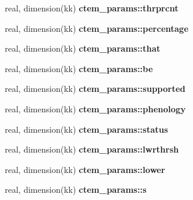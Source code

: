 \begin{DoxyCompactItemize}
\item 
\hypertarget{namespacectem__params_af5b1d396f621af177ae9b6011942df1c}{}real, dimension(kk) {\bfseries ctem\+\_\+params\+::thrprcnt}\label{namespacectem__params_af5b1d396f621af177ae9b6011942df1c}

\item 
\hypertarget{namespacectem__params_a815762546bc78fafa119f065d8c82038}{}real, dimension(kk) {\bfseries ctem\+\_\+params\+::percentage}\label{namespacectem__params_a815762546bc78fafa119f065d8c82038}

\item 
\hypertarget{namespacectem__params_a5ab7631de5a4b8262bd32cb00c568dd0}{}real, dimension(kk) {\bfseries ctem\+\_\+params\+::that}\label{namespacectem__params_a5ab7631de5a4b8262bd32cb00c568dd0}

\item 
\hypertarget{namespacectem__params_a054fdf169977a99a0c2ff7a0560f025f}{}real, dimension(kk) {\bfseries ctem\+\_\+params\+::be}\label{namespacectem__params_a054fdf169977a99a0c2ff7a0560f025f}

\item 
\hypertarget{namespacectem__params_a2f7c30427566cd62480b986b9700da1e}{}real, dimension(kk) {\bfseries ctem\+\_\+params\+::supported}\label{namespacectem__params_a2f7c30427566cd62480b986b9700da1e}

\item 
\hypertarget{namespacectem__params_a12aae868891d1bec23d62cb6ad600236}{}real, dimension(kk) {\bfseries ctem\+\_\+params\+::phenology}\label{namespacectem__params_a12aae868891d1bec23d62cb6ad600236}

\item 
\hypertarget{namespacectem__params_addc02ece274e7580aad300e20e29ff02}{}real, dimension(kk) {\bfseries ctem\+\_\+params\+::status}\label{namespacectem__params_addc02ece274e7580aad300e20e29ff02}

\item 
\hypertarget{namespacectem__params_abef1f9707a8519b0dd657de37edc26b1}{}real, dimension(kk) {\bfseries ctem\+\_\+params\+::lwrthrsh}\label{namespacectem__params_abef1f9707a8519b0dd657de37edc26b1}

\item 
\hypertarget{namespacectem__params_a003999c15eac1d56ceb70846760fecf5}{}real, dimension(kk) {\bfseries ctem\+\_\+params\+::lower}\label{namespacectem__params_a003999c15eac1d56ceb70846760fecf5}

\item 
\hypertarget{namespacectem__params_ad93024b8fddf49f7e1bcbe8e6ab15f1b}{}real, dimension(kk) {\bfseries ctem\+\_\+params\+::s}\label{namespacectem__params_ad93024b8fddf49f7e1bcbe8e6ab15f1b}


\end{DoxyCompactItemize}
